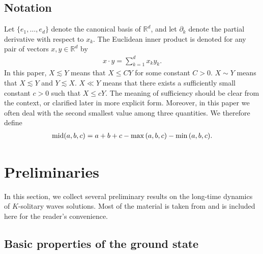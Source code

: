 \documentclass[reqno]{amsart}
\theoremstyle{plain}
\theoremstyle{definition}
\numberwithin{equation}{section}
\newcommand{\m}{\mbox{\textnormal{mid}}}
\newcommand{\1}{\mathbbm{1}}
\begin{document}
\subsection{Notation}
Let $\{e_1,\ldots, e_d\}$ denote the canonical basis of $\mathbb{R}^d$, and let ${\partial}_k$ denote the partial derivative with respect to $x_k$. The Euclidean inner product is denoted for any pair of vectors $x,y\in \mathbb{R}^d$ by
\begin{align}\label{Euclideanproduct}
x\cdot y=\sum_{k=1}^dx_ky_k.
\end{align}
 In this paper, $X\lesssim Y$ means that $X\leq CY$ for some constant $C>0$. $X\sim Y$ means that $X\lesssim Y$ and $Y\lesssim X$. $X\ll Y$ means that there exists a sufficiently small constant $c>0$ such that $X\leq cY$. The meaning of sufficiency should be clear from the context, or clarified later in more explicit form. Moreover, in this paper we often deal with the second smallest value among three quantities. We therefore define
\begin{align}\label{middef}
\m{(a,b,c)}=a+b+c-\max{(a,b,c)}-\min{(a,b,c)}.
\end{align}



\section{Preliminaries}
In this section, we collect several preliminary results on the long-time dynamics of $K$-solitary waves solutions. Most of the material is taken from \cite[Section 2 and 3]{I2} and is included here for the reader's
convenience.

\subsection{Basic properties of the ground state}
\end{document}
